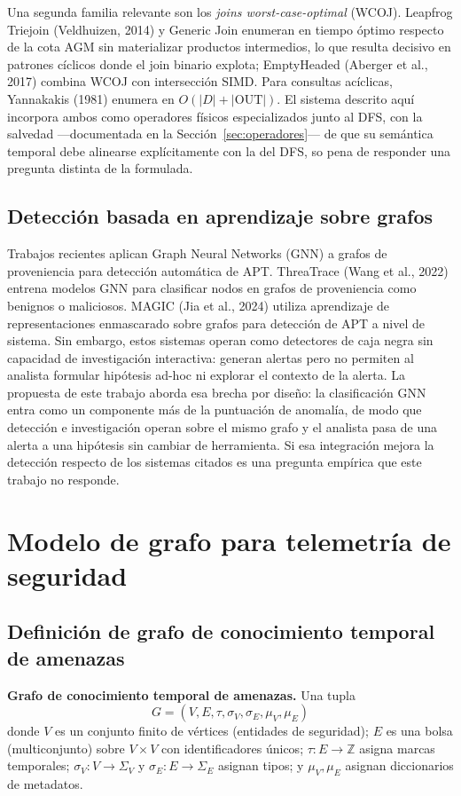 \documentclass[11pt,a4paper]{article}
\begin{document}
Una segunda familia relevante son los \emph{joins worst-case-optimal} (WCOJ).
Leapfrog Triejoin (Veldhuizen, 2014) y Generic Join enumeran en tiempo óptimo
respecto de la cota AGM sin materializar productos intermedios, lo que resulta
decisivo en patrones cíclicos donde el join binario explota; EmptyHeaded
(Aberger et al., 2017) combina WCOJ con intersección SIMD. Para consultas
acíclicas, Yannakakis (1981) enumera en $O(|D| + |\mathrm{OUT}|)$. El sistema
descrito aquí incorpora ambos como operadores físicos especializados junto al
DFS, con la salvedad ---documentada en la Sección~\ref{sec:operadores}--- de
que su semántica temporal debe alinearse explícitamente con la del DFS, so pena
de responder una pregunta distinta de la formulada.

\subsection{Detección basada en aprendizaje sobre grafos}
Trabajos recientes aplican Graph Neural Networks (GNN) a grafos de proveniencia
para detección automática de APT. ThreaTrace (Wang et al., 2022) entrena
modelos GNN para clasificar nodos en grafos de proveniencia como benignos o
maliciosos. MAGIC (Jia et al., 2024) utiliza aprendizaje de representaciones
enmascarado sobre grafos para detección de APT a nivel de sistema. Sin embargo,
estos sistemas operan como detectores de caja negra sin capacidad de
investigación interactiva: generan alertas pero no permiten al analista
formular hipótesis ad-hoc ni explorar el contexto de la alerta. La propuesta de
este trabajo aborda esa brecha por diseño: la clasificación GNN entra como un
componente más de la puntuación de anomalía, de modo que detección e
investigación operan sobre el mismo grafo y el analista pasa de una alerta a
una hipótesis sin cambiar de herramienta. Si esa integración mejora la
detección respecto de los sistemas citados es una pregunta empírica que este
trabajo no responde.

\section{Modelo de grafo para telemetría de seguridad}

\subsection{Definición de grafo de conocimiento temporal de amenazas}
\textbf{Grafo de conocimiento temporal de amenazas.} Una tupla
\[
G = (V, E, \tau, \sigma_V, \sigma_E, \mu_V, \mu_E)
\]
donde $V$ es un conjunto finito de vértices (entidades de seguridad); $E$ es
una bolsa (multiconjunto) sobre $V \times V$ con identificadores únicos;
$\tau : E \to \mathbb{Z}$ asigna marcas temporales; $\sigma_V : V \to \Sigma_V$
y $\sigma_E : E \to \Sigma_E$ asignan tipos; y $\mu_V, \mu_E$ asignan
diccionarios de metadatos.
\end{document}
